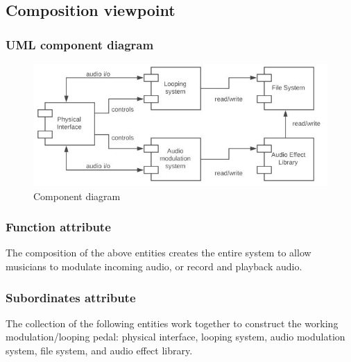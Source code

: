 \subsection{Composition viewpoint}

    \subsubsection{UML component diagram}
        \begin{figure}[!ht]
            \centering
            \includegraphics{diagrams/component-diagram.JPG}
            \caption{Component diagram}
            \label{fig:component}
        \end{figure}
    \subsubsection{Function attribute}
        The composition of the above entities creates the entire system to allow musicians to modulate incoming audio, or record and playback audio.
        
    \subsubsection{Subordinates attribute}
        The collection of the following entities work together to construct the working modulation/looping pedal: physical interface, looping system, audio modulation system, file system, and audio effect library.